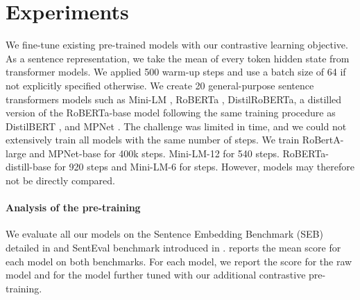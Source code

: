 \section{Experiments}

We fine-tune existing pre-trained models with our contrastive learning objective. As a sentence representation, we take the mean of every token hidden state from transformer models. We applied 500 warm-up steps and use a batch size of 64 if not explicitly specified otherwise. We create 20 general-purpose sentence transformers models such as Mini-LM \parencite{wang_20a}, RoBERTa \parencite{liu_2019}, DistilRoBERTa, a distilled version of the RoBERTa-base model following the same training procedure as DistilBERT \parencite{sanh_19}, and MPNet \parencite{song_20}. The challenge was limited in time, and we could not extensively train all models with the same number of steps. We train RoBertA-large and MPNet-base for 400k steps. Mini-LM-12 for 540 steps. RoBERTa-distill-base for 920 steps and Mini-LM-6 for  steps. However, models may therefore not be directly compared.

\paragraph{Analysis of the pre-training} We evaluate all our models on the Sentence Embedding Benchmark (SEB) detailed in  and SentEval benchmark introduced in .  reports the mean score for each model on both benchmarks. For each model, we report the score for the raw model and for the model further tuned with our additional contrastive pre-training.

